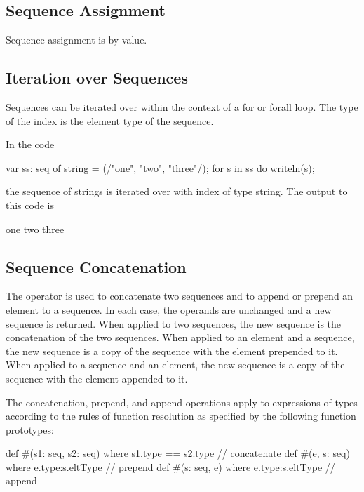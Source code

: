 \subsection{Sequence Assignment}
\label{Sequence_Assignment}

Sequence assignment is by value.

\subsection{Iteration over Sequences}
\label{Iteration_over_Sequences}

Sequences can be iterated over within the context of a for or forall
loop.  The type of the index is the element type of the sequence.
\begin{example}
In the code
\begin{chapel}
var ss: seq of string = (/"one", "two", "three"/);
for s in ss do
  writeln(s);
\end{chapel}
the sequence of strings  is iterated over with
index  of type string.  The output to this code is
\begin{chapel}
one
two
three
\end{chapel}
\end{example}

\subsection{Sequence Concatenation}
\label{Sequence_Concatenation}

The operator \chpl{#} is used to concatenate two sequences and to
append or prepend an element to a sequence.  In each case, the
operands are unchanged and a new sequence is returned.  When applied
to two sequences, the new sequence is the concatenation of the two
sequences.  When applied to an element and a sequence, the new
sequence is a copy of the sequence with the element prepended to it.
When applied to a sequence and an element, the new sequence is a copy
of the sequence with the element appended to it.

The concatenation, prepend, and append operations apply to expressions
of types according to the rules of function resolution as specified by
the following function prototypes:
\begin{chapel}
def #(s1: seq, s2: seq) where s1.type == s2.type // concatenate
def #(e, s: seq) where e.type:s.eltType // prepend
def #(s: seq, e) where e.type:s.eltType // append
\end{chapel}

